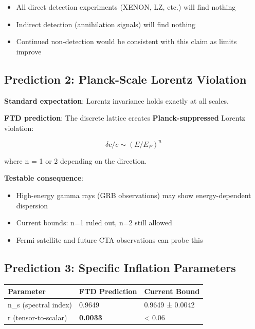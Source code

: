 \documentclass[
  11pt,
  letterpaper,
  twoside,
  openright]{book}
\providecommand{\tightlist}{%
  \setlength{\itemsep}{0pt}\setlength{\parskip}{0pt}}
\begin{document}
\begin{itemize}
\tightlist
\item
  All direct detection experiments (XENON, LZ, etc.) will find nothing
\item
  Indirect detection (annihilation signals) will find nothing
\item
  Continued non-detection would be consistent with this claim as limits
  improve
\end{itemize}

\subsection{Prediction 2: Planck-Scale Lorentz
Violation}\label{prediction-2-planck-scale-lorentz-violation}

\textbf{Standard expectation}: Lorentz invariance holds exactly at all
scales.

\textbf{FTD prediction}: The discrete lattice creates
\textbf{Planck-suppressed} Lorentz violation:

\[\delta c/c \sim (E/E_P)^n\]

where n = 1 or 2 depending on the direction.

\textbf{Testable consequence}:

\begin{itemize}
\tightlist
\item
  High-energy gamma rays (GRB observations) may show energy-dependent
  dispersion
\item
  Current bounds: n=1 ruled out, n=2 still allowed
\item
  Fermi satellite and future CTA observations can probe this
\end{itemize}

\subsection{Prediction 3: Specific Inflation
Parameters}\label{prediction-3-specific-inflation-parameters}

\begin{longtable}[]{@{}lll@{}}
\toprule\noalign{}
Parameter & FTD Prediction & Current Bound \\
\midrule\noalign{}
\endhead
\bottomrule\noalign{}
\endlastfoot
n\_s (spectral index) & 0.9649 & 0.9649 ± 0.0042 \\
r (tensor-to-scalar) & \textbf{0.0033} & \textless{} 0.06 \\
\end{longtable}
\end{document}
